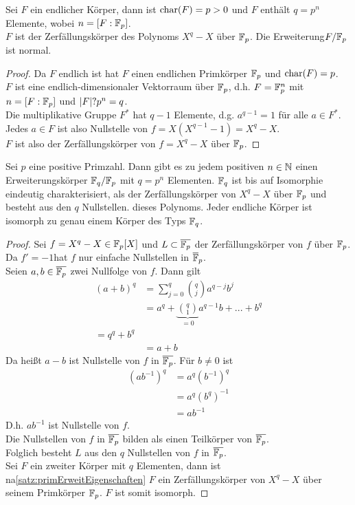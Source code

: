 	\begin{satz}\label{satz:primErweitEigenschaften}
		Sei $F$ ein endlicher Körper, dann ist $\operatorname{char}(F)=p>0$ und $F$ enthält $q=p^n$ Elemente, wobei $n=[F:\mathbb{F}_p]$.\\
		$F$ ist der Zerfällungskörper des Polynoms $X^q-X$ über $\mathbb{F}_p$. Die Erweiterung$F/\mathbb{F}_p$ ist normal.
	\end{satz}
	\begin{proof}
		Da $F$ endlich ist hat $F$ einen endlichen Primkörper $\mathbb{F}_p$ und $\operatorname{char}(F)=p$.\\
		$F$ ist eine endlich-dimensionaler Vektorraum über $\mathbb{F}_p$, d.h. $F=\mathbb{F}_p^n$ mit $n=[F:\mathbb{F}_p]$ und $\left|F\right|?p^n=q$.\\
		Die multiplikative Gruppe $F^*$ hat $q-1$ Elemente, d.g. $a^{q-1}=1$ für alle $a\in F^*$.\\
		Jedes $a\in F$ ist also Nullstelle von $f=X(X^{q-1}-1)=X^q-X$.\\
		$F$ ist also der Zerfällungskörper von $f=X^q-X$ über $\mathbb{F}_p$.
	\end{proof}

	\begin{theorem}
		Sei $p$ eine positive Primzahl. Dann gibt es zu jedem positiven $n\in \mathbb{N}$ einen Erweiterungskörper $\mathbb{F}_q/\mathbb{F}_p$ mit $q=p^n$ Elementen. $\mathbb{F}_q$ ist bis auf Isomorphie eindeutig charakterisiert, als der Zerfällungskörper von $X^q-X$ über $\mathbb{F}_p$ und besteht aus den $q$ Nullstellen. dieses Polynoms. Jeder endliche Körper ist isomorph zu genau einem Körper des Typs $\mathbb{F}_q$.
	\end{theorem}
	\begin{proof}
		Sei $f=X^q-X\in \mathbb{F}_p[X]$ und $L\subset\overline{\mathbb{F}_p}$ der Zerfällungskörper von $f$ über $\mathbb{F}_p$.\\
		Da $f'=-1$hat $f$ nur einfache Nullstellen in $\overline{\mathbb{F}}_p$.\\
		Seien $a,b\in\overline{\mathbb{F}_p}$ zwei Nullfolge von $f$. Dann gilt
		\begin{align*}
		(a+b)^q&=\sum_{j=0}^{q}\binom{q}{j}a^{q-j}b^j\\
		&=a^q+\underbrace{\binom{q}{1}}_{=0}a^{q-1}b+...+b^q\\
		=q^q+b^q\\
		&=a+b
		\end{align*}
		Da heißt $a-b$ ist Nullstelle von $f$ in $\overline{\mathbb{F}_p}$. Für $b\neq 0$ ist
		\begin{align*}
		(ab^{-1})^{q}&=a^q(b^{-1})^q\\
		&=a^{q}(b^q)^{-1}\\
		&=ab^{-1}
		\end{align*}
		D.h. $ab^{-1}$ ist Nullstelle von $f$.\\
		Die Nullstellen von $f$ in $\overline{\mathbb{F}_p}$ bilden als einen Teilkörper von $\overline{\mathbb{F}_p}$.\\
		Folglich besteht $L$ aus den $q$ Nullstellen von $f$ in $\overline{\mathbb{F}_p}$.\\
		Sei $F$ ein zweiter Körper mit $q$ Elementen, dann ist na\ref{satz:primErweitEigenschaften} $F$ ein Zerfällungskörper von $X^q-X$ über seinem Primkörper $\mathbb{F}_p$. $F$ ist somit isomorph.
	\end{proof}

